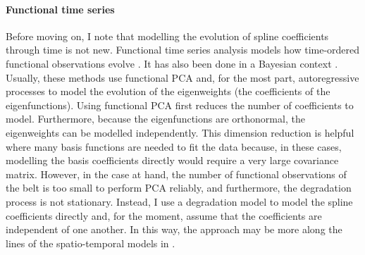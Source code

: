 \paragraph{Functional time series}
Before moving on, I note that modelling the evolution of spline coefficients through time is not new. Functional time series analysis models how time-ordered functional observations evolve \citep{hormann_2012}. It has also been done in a Bayesian context \citep{kowal_2017}. Usually, these methods use functional PCA \citep[p.~16]{ramsay_2009} and, for the most part, autoregressive processes to model the evolution of the eigenweights (the coefficients of the eigenfunctions). Using functional PCA first reduces the number of coefficients to model. Furthermore, because the eigenfunctions are orthonormal, the eigenweights can be modelled independently. This dimension reduction is helpful where many basis functions are needed to fit the data because, in these cases, modelling the basis coefficients directly would require a very large covariance matrix. However, in the case at hand, the number of functional observations of the belt is too small to perform PCA reliably, and furthermore, the degradation process is not stationary. Instead, I use a degradation model to model the spline coefficients directly and, for the moment, assume that the coefficients are independent of one another. In this way, the approach may be more along the lines of the spatio-temporal models in \citet[p.~218-224]{wikle_2019}.

